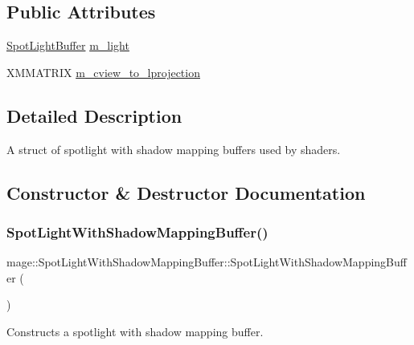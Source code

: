 \subsection*{Public Attributes}
\begin{DoxyCompactItemize}
\item 
\hyperlink{structmage_1_1_spot_light_buffer}{Spot\+Light\+Buffer} \hyperlink{structmage_1_1_spot_light_with_shadow_mapping_buffer_adf2a7b3790e5ca40141a3bfbd9de19bb}{m\+\_\+light}
\item 
X\+M\+M\+A\+T\+R\+IX \hyperlink{structmage_1_1_spot_light_with_shadow_mapping_buffer_a9f265c3662e441dc1d32dd793198ca5f}{m\+\_\+cview\+\_\+to\+\_\+lprojection}
\end{DoxyCompactItemize}


\subsection{Detailed Description}
A struct of spotlight with shadow mapping buffers used by shaders. 

\subsection{Constructor \& Destructor Documentation}
\hypertarget{structmage_1_1_spot_light_with_shadow_mapping_buffer_a96d597bc25801b19e38d3eefa0d662f1}{}\label{structmage_1_1_spot_light_with_shadow_mapping_buffer_a96d597bc25801b19e38d3eefa0d662f1} 
\subsubsection{\texorpdfstring{Spot\+Light\+With\+Shadow\+Mapping\+Buffer()}{SpotLightWithShadowMappingBuffer()}\hspace{0.1cm}{\footnotesize\ttfamily [1/3]}}
{\footnotesize\ttfamily mage\+::\+Spot\+Light\+With\+Shadow\+Mapping\+Buffer\+::\+Spot\+Light\+With\+Shadow\+Mapping\+Buffer (\begin{DoxyParamCaption}{ }\end{DoxyParamCaption})}

Constructs a spotlight with shadow mapping buffer. \hypertarget{structmage_1_1_spot_light_with_shadow_mapping_buffer_aa9078fd9b347d633b48fb8bbb330d54e}{}\label{structmage_1_1_spot_light_with_shadow_mapping_buffer_aa9078fd9b347d633b48fb8bbb330d54e} 
